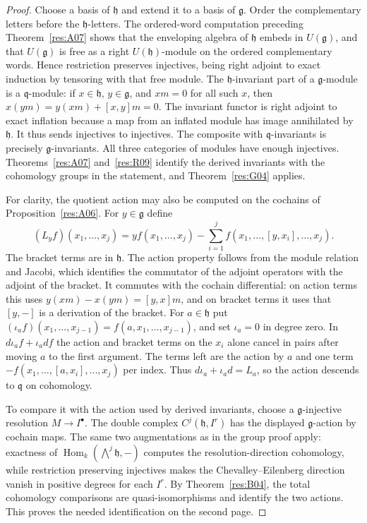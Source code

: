 \begin{proof}
Choose a basis of \(\mathfrak h\) and extend it to a basis of
\(\mathfrak g\). Order the complementary letters before the
\(\mathfrak h\)-letters. The ordered-word computation preceding
Theorem~\ref{res:A07} shows that the enveloping algebra of
\(\mathfrak h\) embeds in \(U(\mathfrak g)\), and that
\(U(\mathfrak g)\) is free as a right \(U(\mathfrak h)\)-module
on the ordered complementary words. Hence restriction preserves
injectives, being right adjoint to exact induction by tensoring
with that free module. The \(\mathfrak h\)-invariant part of a
\(\mathfrak g\)-module is a \(\mathfrak q\)-module:
if \(x\in\mathfrak h\), \(y\in\mathfrak g\), and \(xm=0\) for all
such \(x\), then \(x(ym)=y(xm)+[x,y]m=0\).
The invariant functor is right adjoint to exact inflation
because a map from an inflated module has image annihilated
by \(\mathfrak h\). It thus sends injectives to injectives.
The composite with \(\mathfrak q\)-invariants is precisely
\(\mathfrak g\)-invariants. All three categories of modules
have enough injectives. Theorems~\ref{res:A07} and~\ref{res:R09}
identify the derived invariants with the cohomology groups in
the statement, and Theorem~\ref{res:G04} applies.

For clarity, the quotient action may also be computed on the
cochains of Proposition~\ref{res:A06}. For \(y\in\mathfrak g\)
define
\[
 (L_y f)(x_1,\ldots,x_j)
 =y f(x_1,\ldots,x_j)-
   \sum_{i=1}^{j} f(x_1,\ldots,[y,x_i],\ldots,x_j).
\]
The bracket terms are in \(\mathfrak h\). The action property
follows from the module relation and Jacobi, which identifies the
commutator of the adjoint operators with the adjoint of the bracket.
It commutes with the cochain differential: on action terms this
uses \(y(xm)-x(ym)=[y,x]m\), and on bracket terms it uses that
\([y,-]\) is a derivation of the bracket. For \(a\in\mathfrak h\)
put \((\iota_a f)(x_1,\ldots,x_{j-1})=f(a,x_1,\ldots,x_{j-1})\),
and set \(\iota_a=0\) in degree zero. In
\(d\iota_a f+\iota_a df\) the action and bracket terms
on the \(x_i\) alone cancel in pairs after moving \(a\) to the
first argument. The terms left are the action by \(a\) and
one term \(-f(x_1,\ldots,[a,x_i],\ldots,x_j)\) per index.
Thus \(d\iota_a+\iota_a d=L_a\), so the action descends to
\(\mathfrak q\) on cohomology.

To compare it with the action used by derived invariants, choose
a \(\mathfrak g\)-injective resolution \(M\to I^\bullet\).
The double complex \(C^j(\mathfrak h,I^r)\) has the displayed
\(\mathfrak g\)-action by cochain maps. The same two augmentations
as in the group proof apply: exactness of
\(\operatorname{Hom}_k(\bigwedge^j\mathfrak h,-)\) computes the
resolution-direction cohomology, while restriction preserving
injectives makes the Chevalley--Eilenberg direction vanish in
positive degrees for each \(I^r\). By Theorem~\ref{res:B04},
the total cohomology comparisons are quasi-isomorphisms and
identify the two actions. This proves the needed identification on
the second page.


\end{proof}
